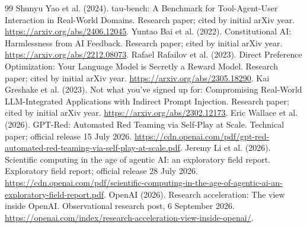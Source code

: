 \begin{thebibliography}{99}
Shunyu Yao et al. (2024). tau-bench: A Benchmark for Tool-Agent-User Interaction in Real-World Domains. Research paper; cited by initial arXiv year. \url{https://arxiv.org/abs/2406.12045}.
Yuntao Bai et al. (2022). Constitutional AI: Harmlessness from AI Feedback. Research paper; cited by initial arXiv year. \url{https://arxiv.org/abs/2212.08073}.
Rafael Rafailov et al. (2023). Direct Preference Optimization: Your Language Model is Secretly a Reward Model. Research paper; cited by initial arXiv year. \url{https://arxiv.org/abs/2305.18290}.
Kai Greshake et al. (2023). Not what you've signed up for: Compromising Real-World LLM-Integrated Applications with Indirect Prompt Injection. Research paper; cited by initial arXiv year. \url{https://arxiv.org/abs/2302.12173}.
Eric Wallace et al. (2026). GPT-Red: Automated Red Teaming via Self-Play at Scale. Technical paper; official release 15 July 2026. \url{https://cdn.openai.com/pdf/gpt-red-automated-red-teaming-via-self-play-at-scale.pdf}.
Jeremy Li et al. (2026). Scientific computing in the age of agentic AI: an exploratory field report. Exploratory field report; official release 28 July 2026. \url{https://cdn.openai.com/pdf/scientific-computing-in-the-age-of-agentic-ai-an-exploratory-field-report.pdf}.
OpenAI (2026). Research acceleration: The view inside OpenAI. Observational research post, 6 September 2026. \url{https://openai.com/index/research-acceleration-view-inside-openai/}.
\end{thebibliography}
